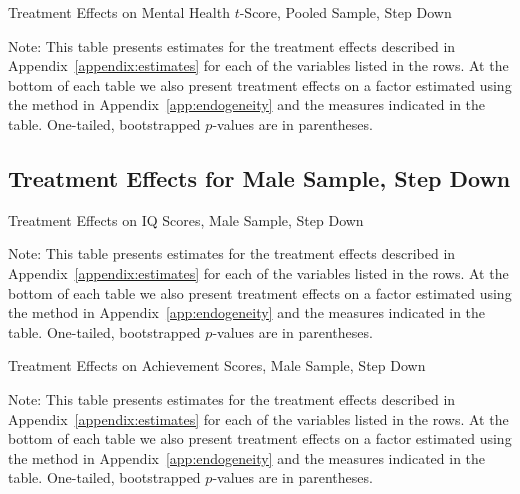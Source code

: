 	\begin{table}[H]
     \caption{Treatment Effects on Mental Health $t$-Score, Pooled Sample, Step Down}
     \label{table:abccare_rslt_pooled_cat16_sd}
	
	\end{table} 
\begin{spacing}{1}
\begin{footnotesize}
\noindent Note: This table presents estimates for the treatment effects described in Appendix~\ref{appendix:estimates} for each of the variables listed in the rows. At the bottom of each table we also present treatment effects on a factor estimated using the method in Appendix~\ref{app:endogeneity} and the measures indicated in the table. One-tailed, bootstrapped $p$-values are in parentheses.
\end{footnotesize}
\end{spacing}






\subsection{Treatment Effects for Male Sample, Step Down}

	\begin{table}[H]
     \caption{Treatment Effects on IQ Scores, Male Sample, Step Down}
     \label{table:abccare_rslt_male_cat0_sd}
	
	\end{table}
\begin{spacing}{1}
\begin{footnotesize}
\noindent Note: This table presents estimates for the treatment effects described in Appendix~\ref{appendix:estimates} for each of the variables listed in the rows. At the bottom of each table we also present treatment effects on a factor estimated using the method in Appendix~\ref{app:endogeneity} and the measures indicated in the table. One-tailed, bootstrapped $p$-values are in parentheses.
\end{footnotesize}
\end{spacing}

	\begin{table}[H]
     \caption{Treatment Effects on Achievement Scores, Male Sample, Step Down}
     \label{table:abccare_rslt_male_cat1_sd}
	
	\end{table} 
\begin{spacing}{1}
\begin{footnotesize}
\noindent Note: This table presents estimates for the treatment effects described in Appendix~\ref{appendix:estimates} for each of the variables listed in the rows. At the bottom of each table we also present treatment effects on a factor estimated using the method in Appendix~\ref{app:endogeneity} and the measures indicated in the table. One-tailed, bootstrapped $p$-values are in parentheses.
\end{footnotesize}
\end{spacing}

